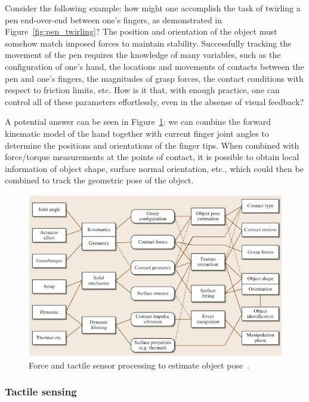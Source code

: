 Consider the following example: how might one accomplish the task of twirling a pen end-over-end between one's fingers, as demonstrated in Figure~\ref{fig:pen_twirling}? 
The position and orientation of the object must somehow match imposed forces to maintain stability.
Successfully tracking the movement of the pen requires the knowledge of many variables, such as the configuration of one's hand, the locations and movements of contacts between the pen and one's fingers, the magnitudes of grasp forces, the contact conditions with respect to friction limits, etc.
How is it that, with enough practice, one can control all of these parameters effortlessly, even in the absense of visual feedback? 

A potential answer can be seen in Figure~\ref{fig:touch_id}: we can combine the forward kinematic model of the hand together with current finger joint angles to determine the positions and orientations of the finger tips.
When combined with force/torque measurements at the points of contact, it is possible to obtain local information of object shape, surface normal orientation, etc., which could then be combined to track the geometric pose of the object.

\begin{figure}[]
	\centering
	\includegraphics[width=\linewidth]{images/touch_id}
	\caption{Force and tactile sensor processing to estimate object pose~\cite{cutkosky2008force}.}
	\label{fig:touch_id}
\end{figure}

\subsubsection*{Tactile sensing}

